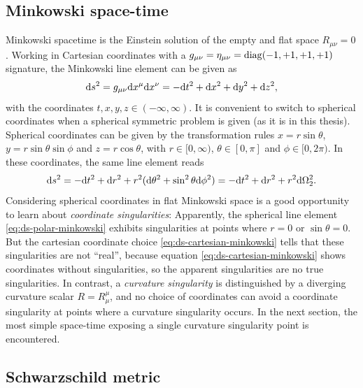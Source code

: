 \documentclass[12pt,a4paper]{report}
\numberwithin{equation}{chapter}
\begin{document}
\subsection{Minkowski space-time}
Minkowski spacetime is the Einstein solution of the empty and flat space $R_{\mu\nu}=0$. Working in Cartesian coordinates with a
$g_{\mu\nu} =\eta_{\mu\nu} = \operatorname{diag}(-1,+1,+1,+1)$ signature, the Minkowski line element can be given as
\begin{equation}\label{eq:ds-cartesian-minkowski}
\mathrm{d} s^2 = g_{\mu\nu} \mathrm{d} x^\mu \mathrm{d} x^\nu = -\mathrm{d} t^2 + \mathrm{d} x^2 + \mathrm{d} y^2 + \mathrm{d} z^2,
\end{equation}
with the coordinates $t,x,y,z \in (-\infty,\infty)$. It is convenient to switch to spherical coordinates when a spherical symmetric problem is given (as it is in this thesis). Spherical coordinates can be given by the transformation rules $x=r \sin \theta$, $y=r \sin \theta \sin \phi$ and $z=r \cos \theta$, with $r\in [0,\infty)$, $\theta\in [0,\pi]$ and $\phi\in[0, 2\pi)$. In these coordinates, the same line element reads
\begin{equation}\label{eq:ds-polar-minkowski}
\mathrm{d} s^2 = -\mathrm{d} t^2 + \mathrm{d} r^2 + r^2(\mathrm{d} \theta^2 + \sin^2 \theta \mathrm{d} \phi^2) = -\mathrm{d} t^2 + \mathrm{d} r^2 + r^2 \mathrm{d} \Omega_2^2.
\end{equation}
Considering spherical coordinates in flat Minkowski space is a good opportunity to learn about \emph{coordinate singularities}: Apparently, the spherical line element \eqref{eq:ds-polar-minkowski} exhibits singularities at points where $r=0$ or $\sin\theta=0$. But the cartesian coordinate choice \eqref{eq:ds-cartesian-minkowski} tells that these singularities are not ``real'', because equation \eqref{eq:ds-cartesian-minkowski} shows coordinates without singularities, so the apparent singularities are no true singularities. In contrast, a \emph{curvature singularity} is distinguished by a diverging curvature scalar $R=R_\mu^\mu$, and no choice of coordinates can avoid a coordinate singularity at points where a curvature singularity occurs. In the next section, the most simple space-time exposing a single curvature singularity point is encountered.

\subsection{Schwarzschild metric}
\end{document}

